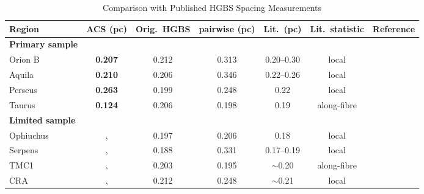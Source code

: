 \documentclass[usenatbib,twoside,twocolumn]{mnras}
\begin{document}
\begin{table}
\caption{Comparison with Published HGBS Spacing Measurements}
\label{tab:literature}
\setlength{\tabcolsep}{4pt}
\footnotesize
\setlength{\tabcolsep}{2.5pt}
\begin{tabular}{lcccccc}
\toprule
Region & ACS (pc) & Orig.\ HGBS & pairwise (pc) & Lit.\ (pc) & Lit.\ statistic & Reference \\
\midrule
\textbf{Primary sample} &  &  &  &  &  &  \\
Orion B & \textbf{0.207} & 0.212 & 0.313 & 0.20--0.30 & local & \citet{Konyves2020} \\
Aquila  & \textbf{0.210} & 0.206 & 0.346 & 0.22--0.26 & local & \citet{Konyves2015} \\
Perseus & \textbf{0.263} & 0.199 & 0.248 & 0.22 & local & \citet{Pezzuto2021} \\
Taurus  & \textbf{0.124} & 0.206 & 0.198 & 0.19 & along-fibre & \citet{Hacar2013} \\
\midrule
\textbf{Limited sample} &  &  &  &  &  &  \\
Ophiuchus &, & 0.197 & 0.206 & 0.18 & local & \citet{Konyves2020} \\
Serpens  &, & 0.188 & 0.331 & 0.17--0.19 & local & \citet{Konyves2020} \\
TMC1     &, & 0.203 & 0.195 & $\sim$0.20 & along-fibre & \citet{Hacar2013} \\
CRA      &, & 0.212 & 0.248 & $\sim$0.21 & local & \citet{Konyves2020} \\
\bottomrule
\end{tabular}


\end{table}
\end{document}
